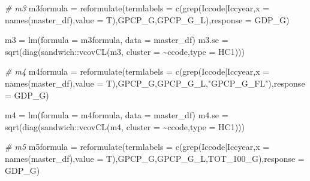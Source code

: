 \documentclass[
]{article}
\newenvironment{Shaded}{\begin{snugshade}}{\end{snugshade}}
\newcommand{\AttributeTok}[1]{\textcolor[rgb]{0.77,0.63,0.00}{#1}}
\newcommand{\CommentTok}[1]{\textcolor[rgb]{0.56,0.35,0.01}{\textit{#1}}}
\newcommand{\FunctionTok}[1]{\textcolor[rgb]{0.00,0.00,0.00}{#1}}
\newcommand{\NormalTok}[1]{#1}
\newcommand{\OtherTok}[1]{\textcolor[rgb]{0.56,0.35,0.01}{#1}}
\newcommand{\SpecialCharTok}[1]{\textcolor[rgb]{0.00,0.00,0.00}{#1}}
\newcommand{\StringTok}[1]{\textcolor[rgb]{0.31,0.60,0.02}{#1}}
\begin{document}
\begin{Shaded}
\begin{Highlighting}[]
\CommentTok{\# m3}
\NormalTok{m3formula }\OtherTok{=} \FunctionTok{reformulate}\NormalTok{(}\AttributeTok{termlabels =} \FunctionTok{c}\NormalTok{(}\FunctionTok{grep}\NormalTok{(}\StringTok{\textquotesingle{}Iccode|Iccyear\textquotesingle{}}\NormalTok{,}\AttributeTok{x =} \FunctionTok{names}\NormalTok{(master\_df),}\AttributeTok{value =}\NormalTok{ T),}\StringTok{\textquotesingle{}GPCP\_G\textquotesingle{}}\NormalTok{,}\StringTok{\textquotesingle{}GPCP\_G\_L\textquotesingle{}}\NormalTok{),}\AttributeTok{response =} \StringTok{\textquotesingle{}GDP\_G\textquotesingle{}}\NormalTok{)}

\NormalTok{m3 }\OtherTok{=} \FunctionTok{lm}\NormalTok{(}\AttributeTok{formula =}\NormalTok{ m3formula, }\AttributeTok{data =}\NormalTok{ master\_df)}
\NormalTok{m3.se }\OtherTok{=} \FunctionTok{sqrt}\NormalTok{(}\FunctionTok{diag}\NormalTok{(sandwich}\SpecialCharTok{::}\FunctionTok{vcovCL}\NormalTok{(m3, }\AttributeTok{cluster =} \SpecialCharTok{\textasciitilde{}}\NormalTok{ccode,}\AttributeTok{type =} \StringTok{\textquotesingle{}HC1\textquotesingle{}}\NormalTok{)))}

\CommentTok{\# m4}
\NormalTok{m4formula }\OtherTok{=} \FunctionTok{reformulate}\NormalTok{(}\AttributeTok{termlabels =} \FunctionTok{c}\NormalTok{(}\FunctionTok{grep}\NormalTok{(}\StringTok{\textquotesingle{}Iccode|Iccyear\textquotesingle{}}\NormalTok{,}\AttributeTok{x =} \FunctionTok{names}\NormalTok{(master\_df),}\AttributeTok{value =}\NormalTok{ T),}\StringTok{\textquotesingle{}GPCP\_G\textquotesingle{}}\NormalTok{,}\StringTok{\textquotesingle{}GPCP\_G\_L\textquotesingle{}}\NormalTok{,}\StringTok{"GPCP\_G\_FL"}\NormalTok{),}\AttributeTok{response =} \StringTok{\textquotesingle{}GDP\_G\textquotesingle{}}\NormalTok{)}

\NormalTok{m4 }\OtherTok{=} \FunctionTok{lm}\NormalTok{(}\AttributeTok{formula =}\NormalTok{ m4formula, }\AttributeTok{data =}\NormalTok{ master\_df)}
\NormalTok{m4.se }\OtherTok{=} \FunctionTok{sqrt}\NormalTok{(}\FunctionTok{diag}\NormalTok{(sandwich}\SpecialCharTok{::}\FunctionTok{vcovCL}\NormalTok{(m4, }\AttributeTok{cluster =} \SpecialCharTok{\textasciitilde{}}\NormalTok{ccode,}\AttributeTok{type =} \StringTok{\textquotesingle{}HC1\textquotesingle{}}\NormalTok{)))}


\CommentTok{\# m5}
\NormalTok{m5formula }\OtherTok{=} \FunctionTok{reformulate}\NormalTok{(}\AttributeTok{termlabels =} \FunctionTok{c}\NormalTok{(}\FunctionTok{grep}\NormalTok{(}\StringTok{\textquotesingle{}Iccode|Iccyear\textquotesingle{}}\NormalTok{,}\AttributeTok{x =} \FunctionTok{names}\NormalTok{(master\_df),}\AttributeTok{value =}\NormalTok{ T),}\StringTok{\textquotesingle{}GPCP\_G\textquotesingle{}}\NormalTok{,}\StringTok{\textquotesingle{}GPCP\_G\_L\textquotesingle{}}\NormalTok{,}\StringTok{\textquotesingle{}TOT\_100\_G\textquotesingle{}}\NormalTok{),}\AttributeTok{response =} \StringTok{\textquotesingle{}GDP\_G\textquotesingle{}}\NormalTok{)}


\end{Highlighting}
\end{Shaded}
\end{document}
